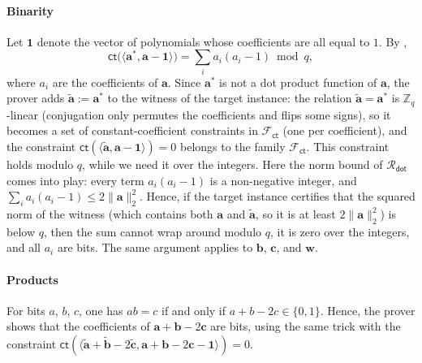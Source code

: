 \documentclass[../../book.tex]{subfiles}
\begin{document}
\paragraph{Binarity}
Let $\mathbf{1}$ denote the vector of polynomials whose coefficients are all equal to $1$.
By ,
\begin{equation*}
    \mathsf{ct}\big(\langle \mathbf{a}^{\ast}, \mathbf{a} - \mathbf{1} \rangle\big) = \sum_{i} a_i(a_i - 1) \bmod q,
\end{equation*}
where $a_i$ are the coefficients of $\mathbf{a}$.
Since $\mathbf{a}^{\ast}$ is not a dot product function of $\mathbf{a}$, the prover adds $\widetilde{\mathbf{a}} := \mathbf{a}^{\ast}$ to the witness of the target instance: the relation $\widetilde{\mathbf{a}} = \mathbf{a}^{\ast}$ is $\mathbb{Z}_q$-linear (conjugation only permutes the coefficients and flips some signs), so it becomes a set of constant-coefficient constraints in $\mathcal{F}_{\mathsf{ct}}$ (one per coefficient), and the constraint $\mathsf{ct}(\langle \widetilde{\mathbf{a}}, \mathbf{a} - \mathbf{1} \rangle) = 0$ belongs to the family $\mathcal{F}_{\mathsf{ct}}$.
This constraint holds modulo $q$, while we need it over the integers.
Here the norm bound of $\mathcal{R}_{\mathsf{dot}}$ comes into play: every term $a_i(a_i - 1)$ is a non-negative integer, and $\sum_i a_i(a_i - 1) \leq 2\|\mathbf{a}\|_2^2$.
Hence, if the target instance certifies that the squared norm of the witness (which contains both $\mathbf{a}$ and $\widetilde{\mathbf{a}}$, so it is at least $2\|\mathbf{a}\|_2^2$) is below $q$, then the sum cannot wrap around modulo $q$, it is zero over the integers, and all $a_i$ are bits.
The same argument applies to $\mathbf{b}$, $\mathbf{c}$, and $\mathbf{w}$.

\paragraph{Products}
For bits $a$, $b$, $c$, one has $ab = c$ if and only if $a + b - 2c \in \{0, 1\}$.
Hence, the prover shows that the coefficients of $\mathbf{a} + \mathbf{b} - 2\mathbf{c}$ are bits, using the same trick with the constraint $\mathsf{ct}(\langle \widetilde{\mathbf{a}} + \widetilde{\mathbf{b}} - 2\widetilde{\mathbf{c}}, \mathbf{a} + \mathbf{b} - 2\mathbf{c} - \mathbf{1} \rangle) = 0$.
\end{document}
